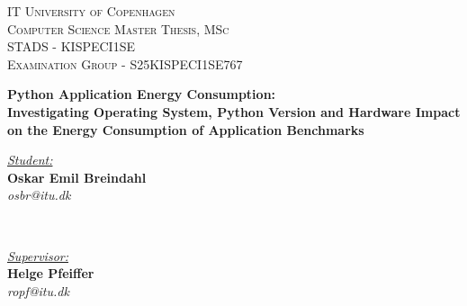 \begin{titlepage} %
	\newcommand{\HRule}{\rule{\linewidth}{0.5mm}} %
	
	\center %
	
	
	\textsc{\LARGE IT University of Copenhagen}\\[1.5cm] %
	
	\textsc{\Large Computer Science Master Thesis, MSc}\\[0.5cm] %

    \textsc{\large STADS - KISPECI1SE}\\[0.5cm]

    \textsc{\large Examination Group - S25KISPECI1SE767}\\[0.5cm]
 
	

    \vfill
    
	{\huge\bfseries Python Application Energy Consumption:\\ Investigating Operating System, Python Version and Hardware Impact on the Energy Consumption of Application Benchmarks}\\[1cm] %
	
    \vfill


	
	\begin{minipage}{0.4\textwidth}
		\begin{flushleft}
			\large
			\underline{\textit{Student:}}\\
            \textbf{Oskar Emil Breindahl}\\    \textit{osbr@itu.dk} \\
		\end{flushleft}
	\end{minipage}
	~
	\begin{minipage}{0.4\textwidth}
		\begin{flushright}
			\large
			\underline{\textit{Supervisor:}}\\
			\textbf{Helge Pfeiffer} %
			\\
			\textit{ropf@itu.dk}
			\\
		\end{flushright}
	\end{minipage}
	

\end{titlepage}
